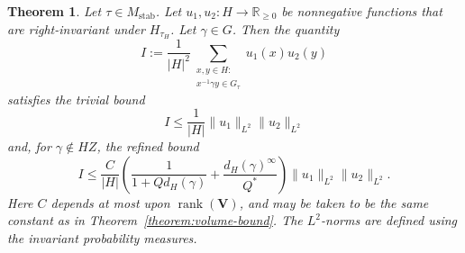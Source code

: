 \documentclass[reqno]{amsart}
\DeclareMathOperator{\stab}{stab}
\DeclareMathOperator{\rank}{rank}
\theoremstyle{plain} \newtheorem{theorem} {Theorem} \newtheorem{conjecture} {Conjecture} \newtheorem{corollary} [theorem] {Corollary} \newtheorem{proposition} [theorem] {Proposition} \newtheorem{fact} [theorem] {Fact}
\theoremstyle{definition} \newtheorem{definition} [theorem] {Definition}
\theoremstyle{itplain} %
\begin{document}
\begin{theorem}\label{theorem:bilinear-forms-estimate}
  Let $\tau \in M_{\stab}$.  Let $u_1, u_2 : H \rightarrow \mathbb{R}_{\geq 0}$ be nonnegative functions that are right-invariant under $H_{\tau_H}$.  Let $\gamma \in G$.  Then the quantity
  \begin{equation}\label{eqn:i-:=-frac1lv-h-rvert2-sum-_-subst-x-y-in-h-:-}
    I := 
    \frac{1}{\lvert H \rvert^2}
    \sum _{
      \substack{
        x, y \in H :  \\
        x ^{-1} \gamma y \in G_\tau
      }
    }
    u_1(x) u_2(y)
  \end{equation}
  satisfies the trivial bound
  \begin{equation}\label{eqn:volume-bound-trivial}
    I \leq \frac{1}{|H|} \lVert u_1 \rVert_{L^2} \lVert u_2 \rVert_{L^2}
  \end{equation}
  and, for $\gamma \notin H Z$, the refined bound
  \begin{equation}\label{eqn:volume-bound-refined}
    I \leq
    \frac{C}{|H|} \left( \frac{1}{1 + Q d_H(\gamma)} + \frac{{d_H(\gamma)}^\infty }{Q^*} \right) \lVert u_1 \rVert_{L^2} \lVert u_2 \rVert_{L^2}.
  \end{equation}
  Here $C$ depends at most upon $\rank(\mathbf{V})$, and may be taken to be the same constant as in Theorem~\ref{theorem:volume-bound}.  The $L^2$-norms are defined using the invariant probability measures.
\end{theorem}
\end{document}
